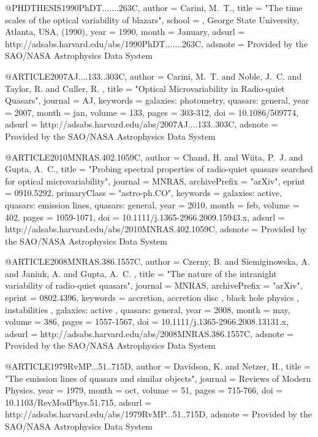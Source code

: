 \documentclass[twocolumn]{aastex62}
\def\aj{{AJ}}\def\actaa{{Acta Astron.}}\def\araa{{ARA\&A}}\def\apj{{ApJ}}\def\apjl{{ApJ}}\def\apjs{{ApJS}}\def\aap{{A\&A}}\def\aapr{{A\&A~Rev.}}\def\aaps{{A\&AS}}\def\apss{{Ap\&SS}}\def\baas{{BAAS}}\def\caa{{Chinese Astron. Astrophys.}}\def\cjaa{{Chinese J. Astron. Astrophys.}}\def\icarus{{Icarus}}\def\jcap{{J. Cosmology Astropart. Phys.}}\def\jrasc{{JRASC}}\def\memras{{MmRAS}}\def\mnras{{MNRAS}}\def\na{{New A}}\def\nar{{New A Rev.}}\def\pra{{Phys.~Rev.~A}}\def\prb{{Phys.~Rev.~B}}\def\prc{{Phys.~Rev.~C}}\def\prd{{Phys.~Rev.~D}}\def\pre{{Phys.~Rev.~E}}\def\prl{{Phys.~Rev.~Lett.}}\def\pasa{{PASA}}\def\pasp{{PASP}}\def\pasj{{PASJ}}
\begin{document}
@PHDTHESIS{1990PhDT.......263C,
   author = {{Carini}, M.~T.},
    title = "{The time scales of the optical variability of blazars}",
   school = {, George State University, Atlanta, USA, (1990)},
     year = 1990,
    month = January,
   adsurl = {http://adsabs.harvard.edu/abs/1990PhDT.......263C},
  adsnote = {Provided by the SAO/NASA Astrophysics Data System}
}


@ARTICLE{2007AJ....133..303C,
   author = {{Carini}, M.~T. and {Noble}, J.~C. and {Taylor}, R. and {Culler}, R.
	},
    title = "{Optical Microvariability in Radio-quiet Quasars}",
  journal = {\aj},
 keywords = {galaxies: photometry, quasars: general},
     year = 2007,
    month = jan,
   volume = 133,
    pages = {303-312},
      doi = {10.1086/509774},
   adsurl = {http://adsabs.harvard.edu/abs/2007AJ....133..303C},
  adsnote = {Provided by the SAO/NASA Astrophysics Data System}
}


@ARTICLE{2010MNRAS.402.1059C,
   author = {{Chand}, H. and {Wiita}, P.~J. and {Gupta}, A.~C.},
    title = "{Probing spectral properties of radio-quiet quasars searched for optical microvariability}",
  journal = {\mnras},
archivePrefix = "arXiv",
   eprint = {0910.5292},
 primaryClass = "astro-ph.CO",
 keywords = {galaxies: active, quasars: emission lines, quasars: general},
     year = 2010,
    month = feb,
   volume = 402,
    pages = {1059-1071},
      doi = {10.1111/j.1365-2966.2009.15943.x},
   adsurl = {http://adsabs.harvard.edu/abs/2010MNRAS.402.1059C},
  adsnote = {Provided by the SAO/NASA Astrophysics Data System}
}



@ARTICLE{2008MNRAS.386.1557C,
   author = {{Czerny}, B. and {Siemiginowska}, A. and {Janiuk}, A. and {Gupta}, A.~C.
	},
    title = "{The nature of the intranight variability of radio-quiet quasars}",
  journal = {\mnras},
archivePrefix = "arXiv",
   eprint = {0802.4396},
 keywords = {accretion, accretion disc , black hole physics , instabilities , galaxies: active , quasars: general},
     year = 2008,
    month = may,
   volume = 386,
    pages = {1557-1567},
      doi = {10.1111/j.1365-2966.2008.13131.x},
   adsurl = {http://adsabs.harvard.edu/abs/2008MNRAS.386.1557C},
  adsnote = {Provided by the SAO/NASA Astrophysics Data System}
}


@ARTICLE{1979RvMP...51..715D,
   author = {{Davidson}, K. and {Netzer}, H.},
    title = "{The emission lines of quasars and similar objects}",
  journal = {Reviews of Modern Physics},
     year = 1979,
    month = oct,
   volume = 51,
    pages = {715-766},
      doi = {10.1103/RevModPhys.51.715},
   adsurl = {http://adsabs.harvard.edu/abs/1979RvMP...51..715D},
  adsnote = {Provided by the SAO/NASA Astrophysics Data System}
}
\end{document}
